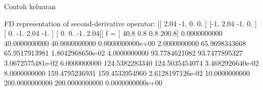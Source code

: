 Contoh keluaran
\begin{textcode}
FD representation of second-derivative operator:
[[ 2.04 -1.    0.    0.  ]
 [-1.    2.04 -1.    0.  ]
 [ 0.   -1.    2.04 -1.  ]
 [ 0.    0.   -1.    2.04]]
f =  [ 40.8   0.8   0.8 200.8]
      0.0000000000      40.0000000000      40.0000000000   0.0000000000e+00
      2.0000000000      65.9698343668      65.9517913981   1.8042968650e-02
      4.0000000000      93.7784621082      93.7477895327   3.0672575481e-02
      6.0000000000     124.5382283340     124.5035454074   3.4682926640e-02
      8.0000000000     159.4795236931     159.4533954960   2.6128197126e-02
     10.0000000000     200.0000000000     200.0000000000   0.0000000000e+00
\end{textcode}


